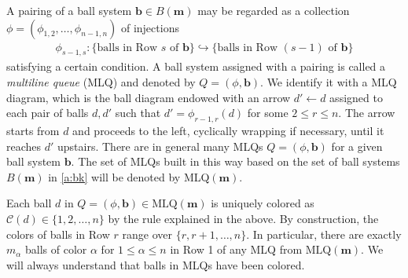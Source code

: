 \documentclass[11pt]{article}
\theoremstyle{definition}
\numberwithin{equation}{section}
\newcommand{\bb}{\mathbf{b}}
\newcommand{\mm}{\mathbf{m}}
\newcommand{\defn}[1]{{\color{blue}\emph{#1}}}
\begin{document}
A pairing of a ball system  $\bb \in B(\mm)$ may be regarded as a collection 
$\phi=(\phi_{1,2},\ldots, \phi_{n-1,n})$ of injections
\begin{align}\label{a:inj}
\phi_{s-1,s} \colon 
 \{ \text{balls in Row $s$ of $\bb$} \} \hookrightarrow \{ \text{balls in Row $(s-1)$ of $\bb$} \}
 \end{align}
satisfying a certain condition.
%
A ball system assigned with a pairing is called a \defn{multiline queue} (MLQ) and 
denoted by $Q = (\phi, \bb)$.
We identify it with a MLQ diagram, which is the ball diagram endowed with an arrow $d' \leftarrow d$ assigned to 
each pair of balls $d, d'$ such that $d'=\phi_{r-1,r}(d)$ for some 
$2 \le r \le n$. 
The arrow starts from $d$ and proceeds to the left, cyclically wrapping if necessary, until it 
reaches $d'$ upstairs. 
There are in general many MLQs $Q = (\phi,\bb)$ for a given ball system $\bb$. 
The set of MLQs built in this way based on the set of ball systems $B(\mm)$ in 
\eqref{a:bk} will be denoted by MLQ$(\mm)$.

Each ball $d$ in $Q = (\phi,\bb) \in \text{MLQ}(\mm)$ is 
uniquely colored as $\mathcal{C}(d) \in \{1,2,\ldots, n\}$ by the rule explained in the above.
By construction, the colors of balls in Row $r$ range over $\{r, r+1, \ldots, n\}$.
In particular, there are exactly $m_\alpha$ balls of color $\alpha$ for $1 \le \alpha \le n$
in Row 1 of any MLQ from $\text{MLQ}(\mm)$.
We will always understand that balls in MLQs have been colored.
  
\end{document}
